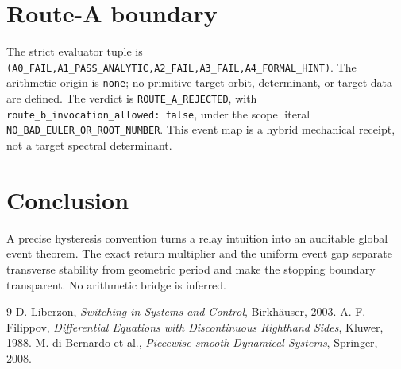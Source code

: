 \documentclass[10pt]{article}
\begin{document}
\section{Route-A boundary}
The strict evaluator tuple is
\texttt{(A0\_FAIL,A1\_PASS\_ANALYTIC,A2\_FAIL,A3\_FAIL,A4\_FORMAL\_HINT)}.
The arithmetic origin is \texttt{none}; no primitive target orbit, determinant,
or target data are defined.  The verdict is
\texttt{ROUTE\_A\_REJECTED}, with
\texttt{route\_b\_invocation\_allowed: false}, under the scope literal
\texttt{NO\_BAD\_EULER\_OR\_ROOT\_NUMBER}.  This event map is a hybrid
mechanical receipt, not a target spectral determinant.

\section{Conclusion}
A precise hysteresis convention turns a relay intuition into an auditable
global event theorem.  The exact return multiplier and the uniform event gap
separate transverse stability from geometric period and make the stopping
boundary transparent.  No arithmetic bridge is inferred.

\begin{thebibliography}{9}
 D. Liberzon, \emph{Switching in Systems and Control},
Birkhäuser, 2003.
 A. F. Filippov, \emph{Differential Equations with
Discontinuous Righthand Sides}, Kluwer, 1988.
 M. di Bernardo et al., \emph{Piecewise-smooth
Dynamical Systems}, Springer, 2008.
\end{thebibliography}
\end{document}
